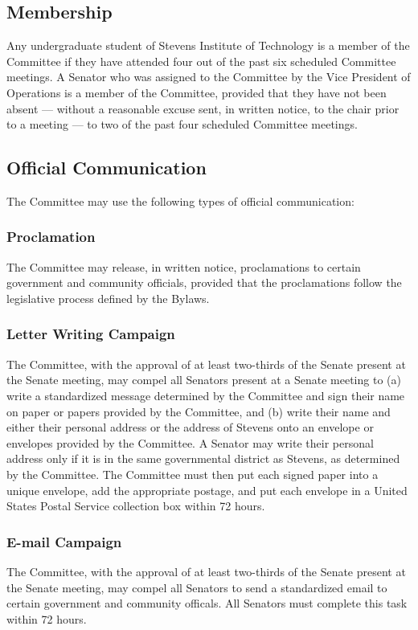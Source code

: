 \documentclass[12pt]{scrreprt}
\begin{document}
\subsection{Membership}
Any undergraduate student of Stevens Institute of Technology is a member of the
Committee if they have attended four out of the past six scheduled Committee
meetings. A Senator who was assigned to the Committee by the Vice President of
Operations is a member of the Committee, provided that they have not been absent —
without a reasonable excuse sent, in written notice, to the chair prior to a meeting — to
two of the past four scheduled Committee meetings.

\subsection{Official Communication}
The Committee may use the following types of official communication:
\subsubsection{Proclamation}
The Committee may release, in written notice, proclamations to certain
government and community officials, provided that the proclamations
follow the legislative process defined by the Bylaws.
\subsubsection{Letter Writing Campaign}
The Committee, with the approval of at least two-thirds of the Senate
present at the Senate meeting, may compel all Senators present at a
Senate meeting to (a) write a standardized message determined by the
Committee and sign their name on paper or papers provided by the
Committee, and (b) write their name and either their personal address or
the address of Stevens onto an envelope or envelopes provided by the
Committee. A Senator may write their personal address only if it is in the
same governmental district as Stevens, as determined by the
Committee. The Committee must then put each signed paper into a
unique envelope, add the appropriate postage, and put each envelope in
a United States Postal Service collection box within 72 hours.
\subsubsection{E-mail Campaign}
The Committee, with the approval of at least two-thirds of the Senate
present at the Senate meeting, may compel all Senators to send a
standardized email to certain government and community officals. All
Senators must complete this task within 72 hours.
\end{document}
